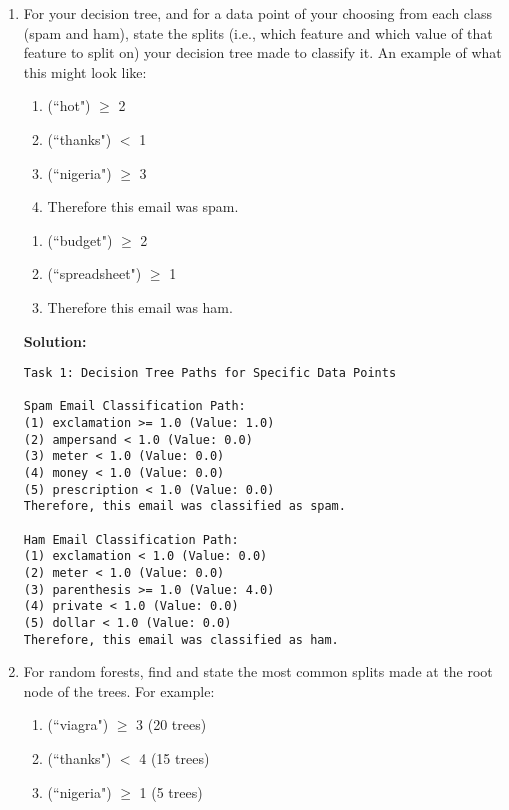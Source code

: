 \documentclass{article}
\newenvironment{solution}{\color{blue} \smallskip \textbf{Solution:}}{}
\begin{document}
\begin{enumerate}
	\item For your decision tree, and for a data point of your choosing from each class (spam and ham), state the splits (i.e., which feature and which value of that feature to split on) your decision tree made to classify it. 
 An example of what this might look like:
	\begin{enumerate}
		\item (``hot") $\geq$ 2
		\item (``thanks") $<$ 1
		\item (``nigeria") $\geq$ 3
		\item Therefore this email was spam.
	\end{enumerate}

	\begin{enumerate}
		\item (``budget") $\geq$ 2
		\item (``spreadsheet") $\geq$ 1
		\item Therefore this email was ham.
	\end{enumerate}
	
    \begin{solution}

\begin{verbatim}
Task 1: Decision Tree Paths for Specific Data Points

Spam Email Classification Path:
(1) exclamation >= 1.0 (Value: 1.0)
(2) ampersand < 1.0 (Value: 0.0)
(3) meter < 1.0 (Value: 0.0)
(4) money < 1.0 (Value: 0.0)
(5) prescription < 1.0 (Value: 0.0)
Therefore, this email was classified as spam.

Ham Email Classification Path:
(1) exclamation < 1.0 (Value: 0.0)
(2) meter < 1.0 (Value: 0.0)
(3) parenthesis >= 1.0 (Value: 4.0)
(4) private < 1.0 (Value: 0.0)
(5) dollar < 1.0 (Value: 0.0)
Therefore, this email was classified as ham.
\end{verbatim}
    



    \end{solution}
    
    \item 
    For random forests, find and state the most common splits made at the root node of the trees. For example:
	\begin{enumerate}
		\item (``viagra") $\geq$ 3 (20 trees)
		\item (``thanks") $<$ 4 (15 trees)
		\item (``nigeria") $\geq$ 1 (5 trees)
	\end{enumerate}


\end{enumerate}
\end{document}
